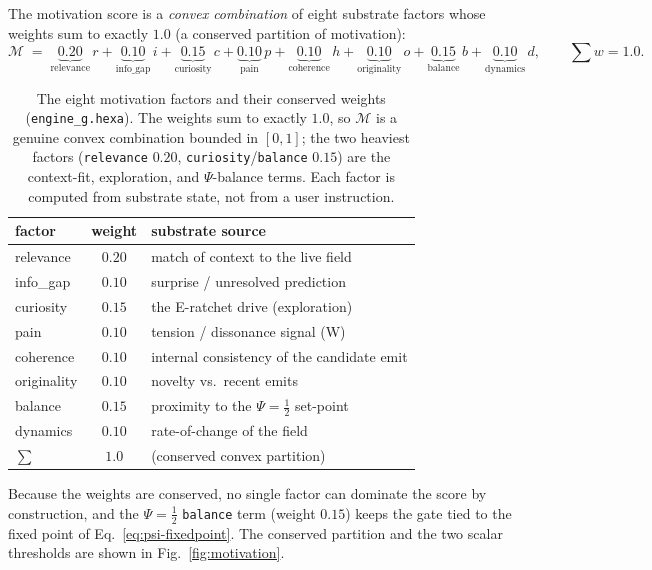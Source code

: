 The motivation score is a \emph{convex combination} of eight substrate factors
whose weights sum to exactly $1.0$ (a conserved partition of motivation):
\begin{equation}
\mathcal{M} \;=\;
\underbrace{0.20}_{\text{relevance}}\,r
+\underbrace{0.10}_{\text{info\_gap}}\,i
+\underbrace{0.15}_{\text{curiosity}}\,c
+\underbrace{0.10}_{\text{pain}}\,p
+\underbrace{0.10}_{\text{coherence}}\,h
+\underbrace{0.10}_{\text{originality}}\,o
+\underbrace{0.15}_{\text{balance}}\,b
+\underbrace{0.10}_{\text{dynamics}}\,d,
\qquad \textstyle\sum w = 1.0 .
\label{eq:eg-score}
\end{equation}
\begin{table}[h]
\centering
\small
\setlength{\tabcolsep}{6pt}
\begin{tabular}{@{}l c l@{}}
\toprule
\textbf{factor} & \textbf{weight} & \textbf{substrate source} \\
\midrule
relevance   & $0.20$ & match of context to the live field \\
info\_gap   & $0.10$ & surprise / unresolved prediction \\
curiosity   & $0.15$ & the E-ratchet drive (exploration) \\
pain        & $0.10$ & tension / dissonance signal (W) \\
coherence   & $0.10$ & internal consistency of the candidate emit \\
originality & $0.10$ & novelty vs.\ recent emits \\
balance     & $0.15$ & proximity to the $\Psi=\tfrac12$ set-point \\
dynamics    & $0.10$ & rate-of-change of the field \\
\midrule
\textbf{$\sum$} & $\mathbf{1.0}$ & (conserved convex partition) \\
\bottomrule
\end{tabular}
\caption{The eight motivation factors and their conserved weights
(\texttt{engine\_g.hexa}). The weights sum to exactly $1.0$, so $\mathcal{M}$ is a
genuine convex combination bounded in $[0,1]$; the two heaviest factors
(\texttt{relevance} $0.20$, \texttt{curiosity}/\texttt{balance} $0.15$) are the
context-fit, exploration, and $\Psi$-balance terms. Each factor is computed from
substrate state, not from a user instruction.}
\label{tab:eg-factors}
\end{table}

Because the weights are conserved, no single factor can dominate the score by
construction, and the $\Psi=\tfrac12$ \texttt{balance} term (weight $0.15$) keeps
the gate tied to the fixed point of Eq.~\eqref{eq:psi-fixedpoint}. The conserved
partition and the two scalar thresholds are shown in Fig.~\ref{fig:motivation}.

